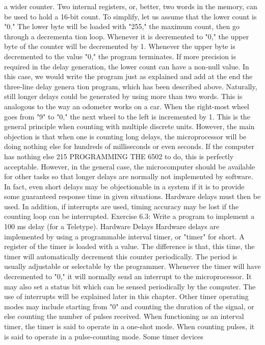 a wider counter. Two internal registers, or, better, two words in the
memory, can be used to hold a 16-bit count. To simplify, let us
assume that the lower count is "0." The lower byte will be loaded
with "255," the maximum count, then go through a decrementa
tion loop. Whenever it is decremented to "0," the upper byte of the
counter will be decremented by 1. Whenever the upper byte is
decremented to the value "0," the program terminates. If more
precision is required in the delay generation, the lower count can
have a non-null value. In this case, we would write the program
just as explained and add at the end the three-line delay genera
tion program, which has been described above.
Naturally, still longer delays could be generated by using more
than two words. This is analogous to the way an odometer works
on a car. When the right-most wheel goes from "9" to "0," the next
wheel to the left is incremented by 1. This is the general principle
when counting with multiple discrete units.
However, the main objection is that when one is counting long
delays, the microprocessor will be doing nothing else for hundreds
of milliseconds or even seconds. If the computer has nothing else
215
PROGRAMMING THE 6502
to do, this is perfectly acceptable. However, in the general case,
the microcomputer should be available for other tasks so that
longer delays are normally not implemented by software. In fact,
even short delays may be objectionable in a system if it is to
provide some guaranteed response time in given situations.
Hardware delays must then be used. In addition, if interrupts are
used, timing accuracy may be lost if the counting loop can be
interrupted.
Exercise 6.3: Write a program to implement a 100 ms delay (for a
Teletype).
Hardware Delays
Hardware delays are implemented by using a programmable
interval timer, or "timer" for short. A register of the timer is loaded
with a value. The difference is that, this time, the timer will
automatically decrement this counter periodically. The period is
usually adjustable or selectable by the programmer. Whenever
the timer will have decremented to "0," it will normally send an
interrupt to the microprocessor. It may also set a status bit which
can be sensed periodically by the computer. The use of interrupts
will be explained later in this chapter.
Other timer operating modes may include starting from "0" and
counting the duration of the signal, or else counting the number
of pulses received. When functioning as an interval timer, the
timer is said to operate in a one-shot mode. When counting pulses,
it is said to operate in a pulse-counting mode. Some timer devices
